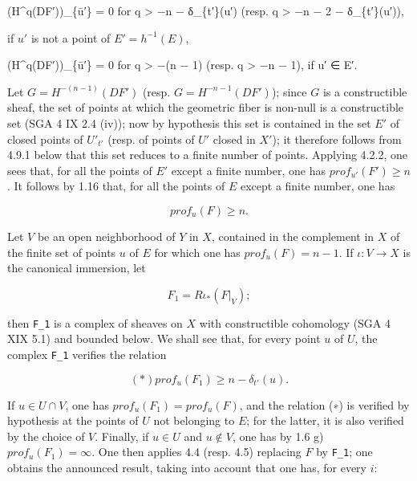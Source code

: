 \documentclass[
]{article}
\newenvironment{Shaded}{}{}
\newcommand{\NormalTok}[1]{#1}
\begin{document}
\begin{Shaded}
\begin{Highlighting}[]
\NormalTok{(H\^{}q(DF′))\_\{ū′\} = 0 for q \textgreater{} −n − δ\_\{t′\}(u′)  (resp. q \textgreater{} −n − 2 − δ\_\{t′\}(u′)),}
\end{Highlighting}
\end{Shaded}

if \(u'\) is not a point of \(E' = h^{-1}(E)\),

\begin{Shaded}
\begin{Highlighting}[]
\NormalTok{(H\^{}q(DF′))\_\{ū′\} = 0 for q \textgreater{} −(n − 1)  (resp. q \textgreater{} −n − 1), if u′ ∈ E′.}
\end{Highlighting}
\end{Shaded}

Let \(G = H^{-(n - 1)}(DF')\) (resp. \(G = H^{-n - 1}(DF')\)); since
\(G\) is a constructible sheaf, the set of points at which the geometric
fiber is non-null is a constructible set (SGA 4 IX 2.4 (iv)); now by
hypothesis this set is contained in the set \(E'\) of closed points of
\(U'_{t'}\) (resp. of points of \(U'\) closed in \(X'\)); it therefore
follows from 4.9.1 below that this set reduces to a finite number of
points. Applying 4.2.2, one sees that, for all the points of \(E'\)
except a finite number, one has \(prof_{u'}(F') \geqslant n\). It
follows by 1.16 that, for all the points of \(E\) except a finite
number, one has

\[
prof_{u}(F) \geqslant n.
\]

Let \(V\) be an open neighborhood of \(Y\) in \(X\), contained in the
complement in \(X\) of the finite set of points \(u\) of \(E\) for which
one has \(prof_{u}(F) = n - 1\). If \(\iota : V \to X\) is the canonical
immersion, let

\[
F_{1} = R \iota_{*}(F|_{V});
\]

then \texttt{F\_1} is a complex of sheaves on \(X\) with constructible
cohomology (SGA 4 XIX 5.1) and bounded below. We shall see that, for
every point \(u\) of \(U\), the complex \texttt{F\_1} verifies the
relation

\[
(\ast)  prof_{u}(F_{1}) \geqslant n - \delta_{t'}(u).
\]

If \(u \in U \cap V\), one has \(prof_{u}(F_{1}) = prof_{u}(F)\), and
the relation (∗) is verified by hypothesis at the points of \(U\) not
belonging to \(E\); for the latter, it is also verified by the choice of
\(V\). Finally, if \(u \in U\) and \(u \notin V\), one has by 1.6 g)
\(prof_{u}(F_{1}) = \infty\). One then applies 4.4 (resp. 4.5) replacing
\(F\) by \texttt{F\_1}; one obtains the announced result, taking into
account that one has, for every \(i\):
\end{document}
